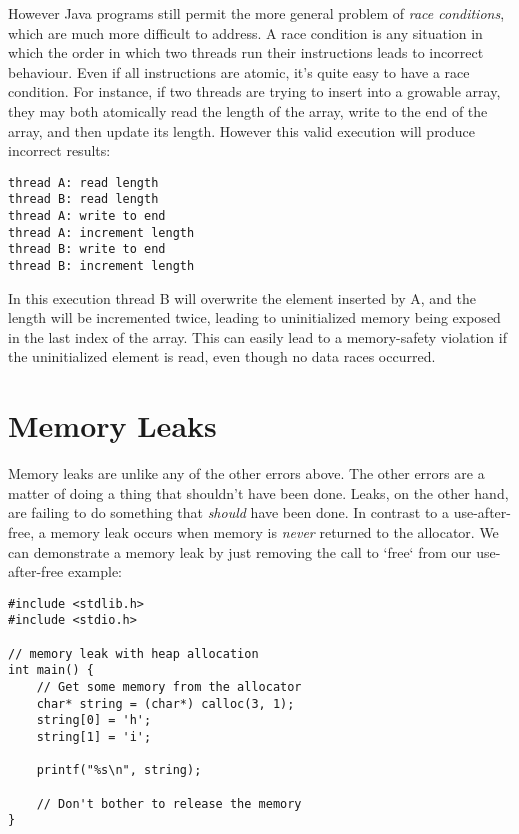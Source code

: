 However Java programs still permit the more general problem of
\emph{race conditions}, which are much more difficult to address. A race condition
is any situation in which the order in which two threads run their instructions
leads to incorrect behaviour. Even if all instructions are atomic, it's quite easy
to have a race condition. For instance, if two threads are trying to insert into
a growable array, they may both atomically read the length of the array,
write to the end of the array, and then update its length. However this valid
execution will produce incorrect results:

\begin{verbatim}
thread A: read length
thread B: read length
thread A: write to end
thread A: increment length
thread B: write to end
thread B: increment length
\end{verbatim}

In this execution thread B will overwrite the element inserted by A, and the length
will be incremented twice, leading to uninitialized memory being exposed in the last
index of the array. This can easily lead to a memory-safety violation if the
uninitialized element is read, even though no data races occurred.





\section{Memory Leaks}

Memory leaks are unlike any of the other errors above. The other errors are a matter
of doing a thing that shouldn't have been done. Leaks, on the other hand, are
failing to do something that \emph{should} have been done. In contrast to a
use-after-free, a memory leak occurs when memory is \emph{never} returned to the allocator.
We can demonstrate a memory leak by just removing the call to `free` from our
use-after-free example:

\begin{verbatim}
#include <stdlib.h>
#include <stdio.h>

// memory leak with heap allocation
int main() {
    // Get some memory from the allocator
    char* string = (char*) calloc(3, 1);
    string[0] = 'h';
    string[1] = 'i';

    printf("%s\n", string);

    // Don't bother to release the memory
}
\end{verbatim}

